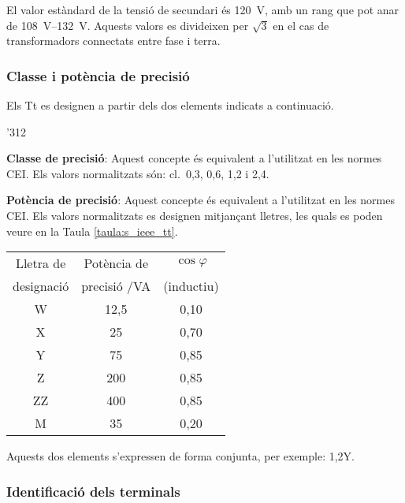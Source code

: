 El valor estàndard de la tensió de
secundari és \SI{120}{V}, amb un rang  que pot anar de \SIrange{108}{132}{V}. Aquests valors es divideixen per $\sqrt{3}$ en el cas de transformadors connectats entre fase i terra.


\subsubsection{Classe i potència de precisió}

Els Tt es designen a partir dels dos
elements indicats a continuació.

\begin{dingautolist}{'312}
    \item \textbf{Classe de precisió}: Aquest concepte és equivalent
    a l'utilitzat en les normes CEI. Els valors
    normalitzats són: cl.~0,3, 0,6, 1,2 i 2,4.

    \item \textbf{Potència de precisió}: Aquest concepte és equivalent
    a l'utilitzat en les normes CEI. Els valors
    normalitzats es designen mitjançant lletres, les quals es poden veure en
    la Taula \vref{taula:s_ieee_tt}.

    \begin{center}
        \label{taula:s_ieee_tt}
        \begin{tabular}{ccc}
        \toprule[1pt]
        Lletra de & Potència de & $\cos\varphi$\\
        designació &  precisió /VA &  (inductiu)\\
        \midrule
        W & 12,5 & 0,10\\
        X & 25 & 0,70 \\
        Y & 75 & 0,85 \\
        Z & 200 & 0,85 \\
        ZZ & 400 & 0,85 \\
        M & 35 & 0,20 \\
        \bottomrule[1pt]
        \end{tabular}
    \end{center}
\end{dingautolist}

Aquests dos elements s'expressen de forma conjunta, per exemple:
1,2Y.

\subsubsection{Identificació dels terminals}

